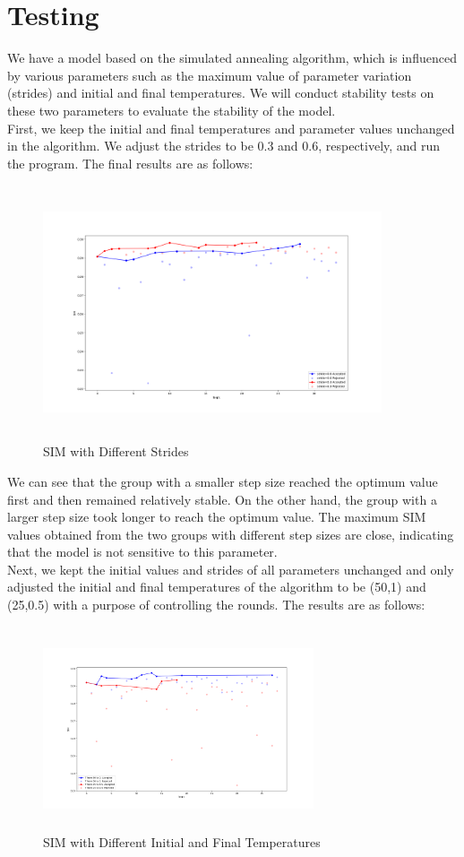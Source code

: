 \section{Testing}
\indent\indent We have a model based on the simulated annealing algorithm, which is influenced by various parameters such as the maximum value of parameter variation (strides) and initial and final temperatures. We will conduct stability tests on these two parameters to evaluate the stability of the model.\\
\indent First, we keep the initial and final temperatures and parameter values unchanged in the algorithm. We adjust the strides to be 0.3 and 0.6, respectively, and run the program. The final results are as follows:
\begin{figure}[H]
    \centering
    \includegraphics[width=10cm,height=7.5cm]{不同步长.png}
    \caption{SIM with Different Strides}
\end{figure}
\indent We can see that the group with a smaller step size reached the optimum value first and then remained relatively stable. On the other hand, the group with a larger step size took longer to reach the optimum value. The maximum SIM values obtained from the two groups with different step sizes are close, indicating that the model is not sensitive to this parameter.\\
\indent Next, we kept the initial values and strides of all parameters unchanged and only adjusted the initial and final temperatures of the algorithm to be (50,1) and (25,0.5) with a purpose of controlling the rounds. The results are as follows:
\begin{figure}[H]
    \centering
    \includegraphics[width=8cm,height=6cm]{T.png}
    \caption{SIM with Different Initial and Final Temperatures}
\end{figure}
